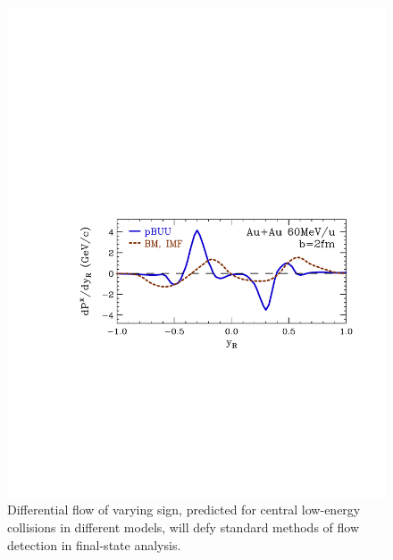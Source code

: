 \documentclass[%
10pt]{article}
\begin{document}
\begin{figure}[htb!]
\centering
\includegraphics[width=0.75\linewidth]{figures/dNpx1.pdf}
\caption{Differential flow of varying sign, predicted for central low-energy collisions in different models, will defy standard methods of flow detection in final-state analysis.
}
\end{figure}



\clearpage
\newpage
\end{document}

